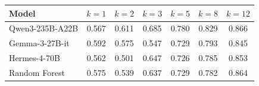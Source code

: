 \begin{tabular}{@{}lcccccc@{}}
\toprule
Model & $k=1$ & $k=2$ & $k=3$ & $k=5$ & $k=8$ & $k=12$ \\
\midrule
Qwen3-235B-A22B & 0.567 & 0.611 & 0.685 & 0.780 & 0.829 & 0.866 \\
Gemma-3-27B-it  & 0.592 & 0.575 & 0.547 & 0.729 & 0.793 & 0.845 \\
Hermes-4-70B    & 0.562 & 0.501 & 0.647 & 0.726 & 0.785 & 0.853 \\
Random Forest   & 0.575 & 0.539 & 0.637 & 0.729 & 0.782 & 0.864 \\
\bottomrule
\end{tabular}
